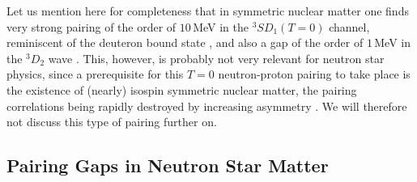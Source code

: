 \documentclass[runningheads]{svmult}
\def\sd{^3\!S\!D_1}
\begin{document}
Let us mention here for completeness that in symmetric nuclear matter
one finds very strong pairing of the order of $10\,$MeV in the 
$\sd (T=0)$ channel, reminiscent of the deuteron bound state
\cite{TAKA93,BALDO1,BALDO2,ALM1,VONDER,ALM2,SSALR95,ALM3,%
BALDO3,MORTEN,LOMBARDO},
and also a gap of the order of $1\,$MeV in the $^3\!D_2$ wave 
\cite{TAKA93,SED95}.
This, however, is probably not very relevant for neutron star physics, 
since a prerequisite for this $T=0$ neutron-proton pairing to take place
is the existence of (nearly) isospin symmetric nuclear matter,
the pairing correlations being rapidly destroyed by increasing 
asymmetry \cite{SAL97,ROEPKE00,SL00}. 
We will therefore not discuss this type of pairing further on. 

\subsection{Pairing Gaps in Neutron Star Matter}
 
\end{document}
